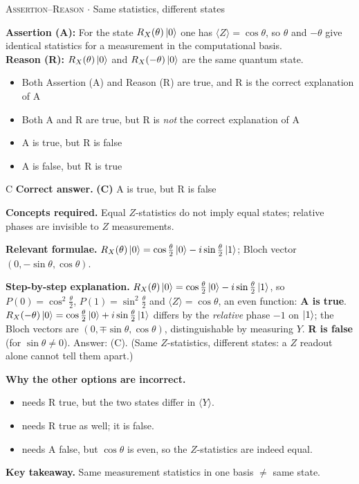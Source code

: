 \documentclass[11pt,a4paper]{article}
\newcommand{\optlabel}[1]{\textbf{(#1)}}
\newcommand{\correctlabel}[1]{\textcolor{okgreen}{\textbf{(#1)}\,\ding{51}}}
\newenvironment{qitem}[1]{\begin{list}{}{\setlength{\leftmargin}{3.3em}\setlength{\labelwidth}{3.1em}%
  \setlength{\labelsep}{0.2em}\setlength{\topsep}{3pt}\setlength{\parsep}{3pt}}\item[\textbf{Q.#1}\hfill]}{\end{list}}
\newcommand{\qsep}{\par\vspace{2pt}{\color{black!15}\hrule}\vspace{4pt}}
\newcommand{\qmeta}[2]{{\footnotesize\color{black!60}\textsc{#1} \;$\cdot$\; #2}\par}
\begin{document}
\begin{qitem}{37}
\qmeta{Assertion--Reason}{Same statistics, different states}
\textbf{Assertion (A):} For the state $R_X(\theta)\ket0$ one has $\langle Z\rangle = \cos\theta$, so $\theta$ and $-\theta$ give
identical statistics for a measurement in the computational basis.\\[1mm]
\textbf{Reason (R):} $R_X(\theta)\ket0$ and $R_X(-\theta)\ket0$ are the same quantum state.
\begin{itemize}[leftmargin=2.6em, labelsep=0.4em, itemsep=2pt, topsep=3pt]
\item[\optlabel{A}] Both Assertion (A) and Reason (R) are true, and R is the correct explanation of A
\item[\optlabel{B}] Both A and R are true, but R is \emph{not} the correct explanation of A
\item[\correctlabel{C}] A is true, but R is false
\item[\optlabel{D}] A is false, but R is true
\end{itemize}
\end{qitem}
\begin{solbox}{C}
\textbf{\color{brand}Correct answer.} \textcolor{okgreen}{\textbf{(C)}} A is true, but R is false

\textbf{\color{brand}Concepts required.} Equal $Z$-statistics do not imply equal states; relative phases are invisible to $Z$ measurements.

\textbf{\color{brand}Relevant formulae.} $R_X(\theta)\ket0 = \cos\frac\theta2\ket0 - i\sin\frac\theta2\ket1$; Bloch vector $(0, -\sin\theta, \cos\theta)$.

\textbf{\color{brand}Step-by-step explanation.} $R_X(\theta)\ket0 = \cos\frac\theta2\ket0 - i\sin\frac\theta2\ket1$, so $P(0) = \cos^2\frac\theta2$, $P(1) = \sin^2\frac\theta2$ and
$\langle Z\rangle = \cos\theta$, an even function: \textbf{A is true}.
$R_X(-\theta)\ket0 = \cos\frac\theta2\ket0 + i\sin\frac\theta2\ket1$ differs by the \emph{relative} phase $-1$ on $\ket1$; the
Bloch vectors are $(0, \mp\sin\theta, \cos\theta)$, distinguishable by measuring $Y$. \textbf{R is false} (for $\sin\theta \neq 0$).
Answer: (C). (Same $Z$-statistics, different states: a $Z$ readout alone cannot tell them apart.)

\textbf{\color{brand}Why the other options are incorrect.}
\begin{itemize}[leftmargin=2.4em, itemsep=1pt, topsep=2pt]
\item[\textbf{(A)}] needs R true, but the two states differ in $\langle Y\rangle$.
\item[\textbf{(B)}] needs R true as well; it is false.
\item[\textbf{(D)}] needs A false, but $\cos\theta$ is even, so the $Z$-statistics are indeed equal.
\end{itemize}
\textbf{\color{brand}Key takeaway.} Same measurement statistics in one basis $\neq$ same state.
\end{solbox}
\qsep
\end{document}

